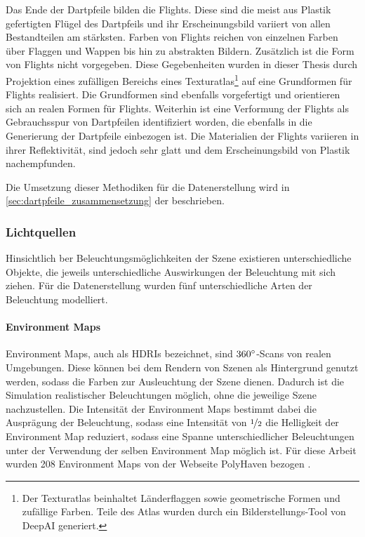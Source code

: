 Das Ende der Dartpfeile bilden die Flights. Diese sind die meist aus Plastik gefertigten Flügel des Dartpfeils und ihr Erscheinungsbild variiert von allen Bestandteilen am stärksten. Farben von Flights reichen von einzelnen Farben über Flaggen und Wappen bis hin zu abstrakten Bildern. Zusätzlich ist die Form von Flights nicht vorgegeben. Diese Gegebenheiten wurden in dieser Thesis durch Projektion eines zufälligen Bereichs eines Texturatlas\footnote{Der Texturatlas beinhaltet Länderflaggen sowie geometrische Formen und zufällige Farben. Teile des Atlas wurden durch ein Bilderstellungs-Tool von DeepAI \cite{deepai-image} generiert.} auf eine Grundformen für Flights realisiert. Die Grundformen sind ebenfalls vorgefertigt und orientieren sich an realen Formen für Flights. Weiterhin ist eine Verformung der Flights als Gebrauchsspur von Dartpfeilen identifiziert worden, die ebenfalls in die Generierung der Dartpfeile einbezogen ist. Die Materialien der Flights variieren in ihrer Reflektivität, sind jedoch sehr glatt und dem Erscheinungsbild von Plastik nachempfunden.

Die Umsetzung dieser Methodiken für die Datenerstellung wird in \autoref{sec:dartpfeile_zusammensetzung} der  beschrieben.

\subsubsection{Lichtquellen}
\label{sec:lichter}

Hinsichtlich ber Beleuchtungsmöglichkeiten der Szene existieren unterschiedliche Objekte, die jeweils unterschiedliche Auswirkungen der Beleuchtung mit sich ziehen. Für die Datenerstellung wurden fünf unterschiedliche Arten der Beleuchtung modelliert.

\paragraph{Environment Maps}

Environment Maps, auch als HDRIs bezeichnet, sind $360^{\circ}$-Scans von realen Umgebungen. Diese können bei dem Rendern von Szenen als Hintergrund genutzt werden, sodass die Farben zur Ausleuchtung der Szene dienen. Dadurch ist die Simulation realistischer Beleuchtungen möglich, ohne die jeweilige Szene nachzustellen. Die Intensität der Environment Maps bestimmt dabei die Ausprägung der Beleuchtung, sodass eine Intensität von $\nicefrac{1}{2}$ die Helligkeit der Environment Map reduziert, sodass eine Spanne unterschiedlicher Beleuchtungen unter der Verwendung der selben Environment Map möglich ist. Für diese Arbeit wurden 208 Environment Maps von der Webseite PolyHaven bezogen \cite{polyhaven}.

